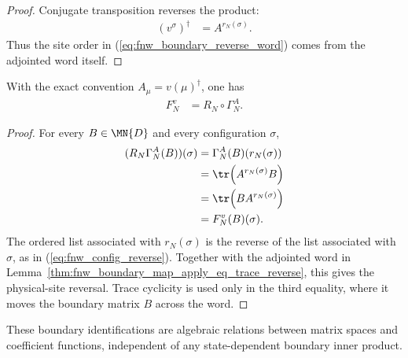 \begin{proof}
    \leanok
    Conjugate transposition reverses the product:
    \begin{align}
        (v^\sigma)^\dagger
         & =A^{r_N(\sigma)}.
    \end{align}
    Thus the site order in (\ref{eq:fnw_boundary_reverse_word}) comes from the
    adjointed word itself.
\end{proof}

\begin{lemma}
    \label{thm:fnw_boundary_map_eq_physical_site_reverse_comp_ground_space_map}
    \leanok
    With the exact convention $A_\mu=v(\mu)^\dagger$, one has
    \begin{align}
        F_N^v
         & =R_N\circ\Gamma_N^A.
        \label{eq:fnw_boundary_ground_space_map}
    \end{align}
\end{lemma}

\begin{proof}
    \leanok
    For every $B\in\MN{D}$ and every configuration $\sigma$,
    \begin{align}
        (R_N\Gamma_N^A(B))(\sigma)
         & =\Gamma_N^A(B)(r_N(\sigma))          \\
         & =\tr\!\left(A^{r_N(\sigma)}B\right)  \\
         & =\tr\!\left(B A^{r_N(\sigma)}\right) \\
         & =F_N^v(B)(\sigma).
    \end{align}
    The ordered list associated with $r_N(\sigma)$ is the reverse of the list
    associated with $\sigma$, as in (\ref{eq:fnw_config_reverse}).  Together
    with the adjointed word in
    Lemma~\ref{thm:fnw_boundary_map_apply_eq_trace_reverse}, this gives the
    physical-site reversal.  Trace cyclicity is used only in the third
    equality, where it moves the boundary matrix $B$ across the word.
\end{proof}

These boundary identifications are algebraic relations between matrix spaces and
coefficient functions, independent of any state-dependent boundary inner product.

